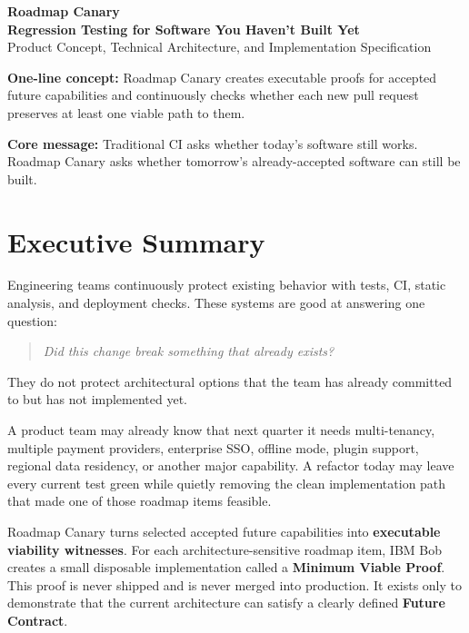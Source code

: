 \documentclass[12pt]{article}
\begin{document}
\begin{center}
    {\Huge\bfseries\color{navy} Roadmap Canary}\\[5pt]
    {\Large\bfseries\color{blue} Regression Testing for Software You Haven't Built Yet}\\[10pt]
    {\large Product Concept, Technical Architecture, and Implementation Specification}
\end{center}

\vspace{8pt}

\begin{pitchbox}
\textbf{One-line concept:}
Roadmap Canary creates executable proofs for accepted future capabilities and continuously checks whether each new pull request preserves at least one viable path to them.
\end{pitchbox}

\begin{pitchbox}
\textbf{Core message:}
Traditional CI asks whether today's software still works. Roadmap Canary asks whether tomorrow's already-accepted software can still be built.
\end{pitchbox}

\tableofcontents
\newpage

\section{Executive Summary}

Engineering teams continuously protect existing behavior with tests, CI, static analysis, and deployment checks. These systems are good at answering one question:

\begin{quote}
\textit{Did this change break something that already exists?}
\end{quote}

They do not protect architectural options that the team has already committed to but has not implemented yet.

A product team may already know that next quarter it needs multi-tenancy, multiple payment providers, enterprise SSO, offline mode, plugin support, regional data residency, or another major capability. A refactor today may leave every current test green while quietly removing the clean implementation path that made one of those roadmap items feasible.

Roadmap Canary turns selected accepted future capabilities into \textbf{executable viability witnesses}. For each architecture-sensitive roadmap item, IBM Bob creates a small disposable implementation called a \textbf{Minimum Viable Proof}. This proof is never shipped and is never merged into production. It exists only to demonstrate that the current architecture can satisfy a clearly defined \textbf{Future Contract}.
\end{document}

